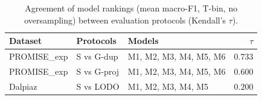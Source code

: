 \begin{table}[H]
\centering
\caption{Agreement of model rankings (mean macro-F1, T-bin, no oversampling) between evaluation protocols (Kendall's $\tau$).}
\label{tab:kendall}
\small
\setlength{\tabcolsep}{4pt}
\begin{tabular}{llp{2.6cm}r}
\toprule
Dataset & Protocols & Models & $\tau$ \\
\midrule
PROMISE\_exp & S vs G-dup & M1, M2, M3, M4, M5, M6 & $0.733$ \\
PROMISE\_exp & S vs G-proj & M1, M2, M3, M4, M5, M6 & $0.600$ \\
Dalpiaz & S vs LODO & M1, M2, M3, M4, M5 & $0.200$ \\
\bottomrule
\end{tabular}
\end{table}
